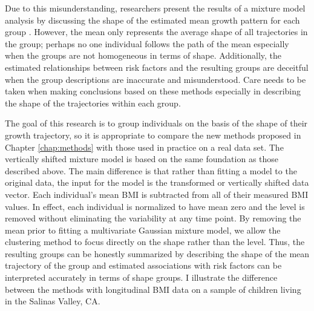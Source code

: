 Due to this misunderstanding, researchers present the results of a mixture model analysis by discussing the shape of the estimated mean growth pattern for each group \cite{pryor2011,carter2012}. However, the mean only represents the average shape of all trajectories in the group; perhaps no one individual follows the path of the mean especially when the groups are not homogeneous in terms of shape. Additionally, the estimated relationships between risk factors and the resulting groups are deceitful when the group descriptions are inaccurate and misunderstood. Care needs to be taken when making conclusions based on these methods especially in describing the shape of the trajectories within each group.  

The goal of this research is to group individuals on the basis of the shape of their growth trajectory, so it is appropriate to compare the new methods proposed in Chapter \ref{chap:methods} with those used in practice on a real data set. The vertically shifted mixture model is based on the same foundation as those described above. The main difference is that rather than fitting a model to the original data, the input for the model is the transformed or vertically shifted data vector. Each individual's mean BMI is subtracted from all of their measured BMI values. In effect, each individual is normalized to have mean zero and the level is removed without eliminating the variability at any time point. By removing the mean prior to fitting a multivariate Gaussian mixture model, we allow the clustering method to focus directly on the shape rather than the level. Thus, the resulting groups can be honestly summarized by describing the shape of the mean trajectory of the group and estimated associations with risk factors can be interpreted accurately in terms of shape groups. I illustrate the difference between the methods with longitudinal BMI data on a sample of children living in the Salinas Valley, CA.


